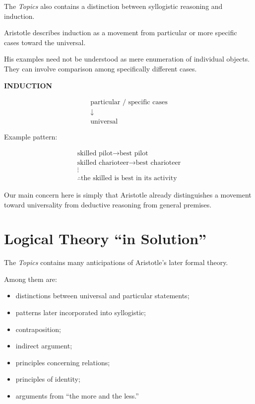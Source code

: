 \documentclass[11pt]{article}
\begin{document}
The \textit{Topics} also contains a distinction between
syllogistic reasoning and induction.

Aristotle describes induction as a movement from particular or
more specific cases toward the universal.

His examples need not be understood as mere enumeration of
individual objects. They can involve comparison among
specifically different cases.

\begin{whiteboard}
\textbf{INDUCTION}

\[
\begin{array}{c}
\text{particular / specific cases}\\
\downarrow\\
\text{universal}
\end{array}
\]

Example pattern:

\[
\begin{array}{c}
\text{skilled pilot} \rightarrow \text{best pilot}\\
\text{skilled charioteer} \rightarrow \text{best charioteer}\\
\vdots\\
\therefore \text{the skilled is best in its activity}
\end{array}
\]
\end{whiteboard}

Our main concern here is simply that Aristotle already
distinguishes a movement toward universality from deductive
reasoning from general premises.

\section{Logical Theory ``in Solution''}

The \textit{Topics} contains many anticipations of Aristotle's
later formal theory.

Among them are:

\begin{itemize}
    \item distinctions between universal and particular
    statements;
    \item patterns later incorporated into syllogistic;
    \item contraposition;
    \item indirect argument;
    \item principles concerning relations;
    \item principles of identity;
    \item arguments from ``the more and the less.''
\end{itemize}
\end{document}
